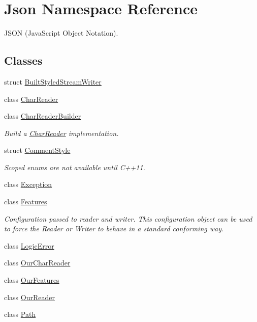 \hypertarget{namespaceJson}{}\section{Json Namespace Reference}
\label{namespaceJson}


J\+S\+ON (Java\+Script Object Notation).  


\subsection*{Classes}
\begin{DoxyCompactItemize}
\item 
struct \hyperlink{structJson_1_1BuiltStyledStreamWriter}{Built\+Styled\+Stream\+Writer}
\item 
class \hyperlink{classJson_1_1CharReader}{Char\+Reader}
\item 
class \hyperlink{classJson_1_1CharReaderBuilder}{Char\+Reader\+Builder}
\begin{DoxyCompactList}\small\item\em Build a \hyperlink{classJson_1_1CharReader}{Char\+Reader} implementation. \end{DoxyCompactList}\item 
struct \hyperlink{structJson_1_1CommentStyle}{Comment\+Style}
\begin{DoxyCompactList}\small\item\em Scoped enums are not available until C++11. \end{DoxyCompactList}\item 
class \hyperlink{classJson_1_1Exception}{Exception}
\item 
class \hyperlink{classJson_1_1Features}{Features}
\begin{DoxyCompactList}\small\item\em Configuration passed to reader and writer. This configuration object can be used to force the Reader or Writer to behave in a standard conforming way. \end{DoxyCompactList}\item 
class \hyperlink{classJson_1_1LogicError}{Logic\+Error}
\item 
class \hyperlink{classJson_1_1OurCharReader}{Our\+Char\+Reader}
\item 
class \hyperlink{classJson_1_1OurFeatures}{Our\+Features}
\item 
class \hyperlink{classJson_1_1OurReader}{Our\+Reader}
\item 
class \hyperlink{classJson_1_1Path}{Path}

\end{DoxyCompactItemize}
